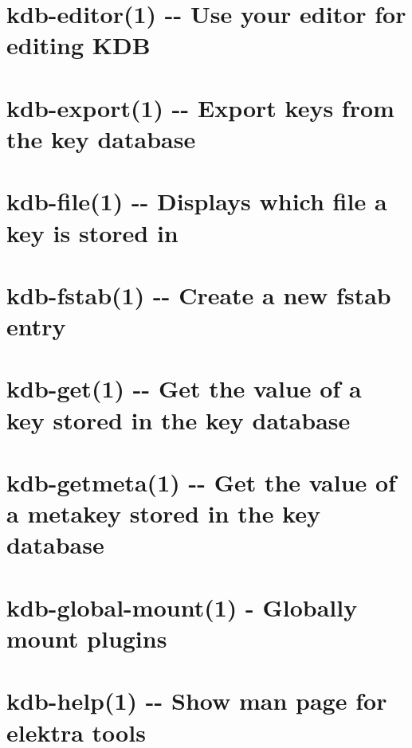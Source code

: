 \documentclass[twoside]{book}
\newcommand{\+}{\discretionary{\mbox{\scriptsize$\hookleftarrow$}}{}{}}
\begin{document}
\chapter{kdb-\/editor(1) -\/-\/ Use your editor for editing K\+D\+B}
\label{md_doc_help_kdb-editor}
\hypertarget{md_doc_help_kdb-editor}{}

\chapter{kdb-\/export(1) -\/-\/ Export keys from the key database}
\label{md_doc_help_kdb-export}
\hypertarget{md_doc_help_kdb-export}{}

\chapter{kdb-\/file(1) -\/-\/ Displays which file a key is stored in}
\label{md_doc_help_kdb-file}
\hypertarget{md_doc_help_kdb-file}{}

\chapter{kdb-\/fstab(1) -\/-\/ Create a new fstab entry}
\label{md_doc_help_kdb-fstab}
\hypertarget{md_doc_help_kdb-fstab}{}

\chapter{kdb-\/get(1) -\/-\/ Get the value of a key stored in the key database}
\label{md_doc_help_kdb-get}
\hypertarget{md_doc_help_kdb-get}{}

\chapter{kdb-\/getmeta(1) -\/-\/ Get the value of a metakey stored in the key database}
\label{md_doc_help_kdb-getmeta}
\hypertarget{md_doc_help_kdb-getmeta}{}

\chapter{kdb-\/global-\/mount(1) -\/ Globally mount plugins}
\label{md_doc_help_kdb-global-mount}
\hypertarget{md_doc_help_kdb-global-mount}{}

\chapter{kdb-\/help(1) -\/-\/ Show man page for elektra tools}
\label{md_doc_help_kdb-help}
\hypertarget{md_doc_help_kdb-help}{}

\end{document}
